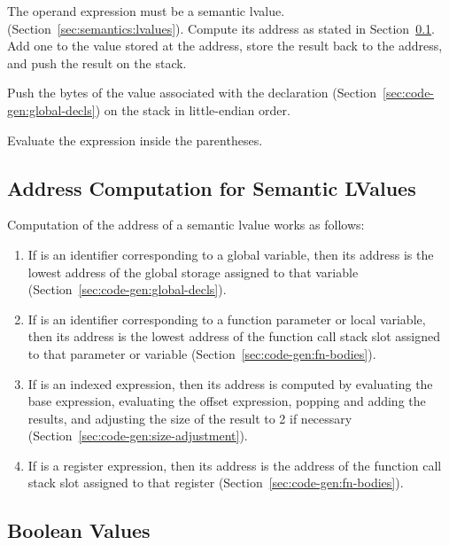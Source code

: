 \documentclass[10pt]{article}
\begin{document}
 The
operand expression must be a semantic
lvalue. (Section~\ref{sec:semantics:lvalues}).  Compute its address as
stated in Section~\ref{sec:code-gen:lvalues}.  Add one to the value
stored at the address, store the result back to the address, and push
the result on the stack.

 Push the bytes of the value associated
with the declaration (Section~\ref{sec:code-gen:global-decls}) on the
stack in little-endian order.

 Evaluate the expression inside the
parentheses.

\subsection{Address Computation for Semantic LValues}
\label{sec:code-gen:lvalues}

Computation of the address of a semantic lvalue  works
as follows:
%
\begin{enumerate}
%
\item If  is an identifier corresponding to a global
  variable, then its address is the lowest address of the global
  storage assigned to that variable
  (Section~\ref{sec:code-gen:global-decls}). 
%
\item If  is an identifier corresponding to a function
  parameter or local variable, then its address is the lowest address
  of the function call stack slot assigned to that parameter or
  variable (Section~\ref{sec:code-gen:fn-bodies}).
%
\item If  is an indexed expression, then its address is
  computed by evaluating the base expression, evaluating the offset
  expression, popping and adding the results, and adjusting the size
  of the result to 2 if necessary
  (Section~\ref{sec:code-gen:size-adjustment}). 
%
\item If  is a register expression, then its address is
  the address of the function call stack slot assigned to that
  register (Section~\ref{sec:code-gen:fn-bodies}).
%
\end{enumerate}

\subsection{Boolean Values}
\label{sec:code-gen:boolean}
\end{document}
